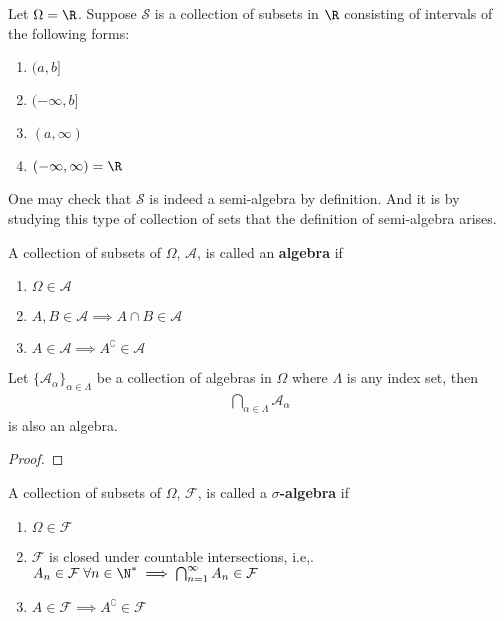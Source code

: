 \documentclass[thmcnt=section, 12pt, color=purple]{my-elegantbook}
\begin{document}
\begin{example} \label{eg:1}
	Let $\Omega = \R$.
	Suppose $\mathcal{S}$ is a collection of subsets in $\R$
	consisting of intervals of the following forms:
	\begin{enumerate}
		\item $(a, b]$
		\item $(-\infty, b]$
		\item $(a, \infty)$
		\item $(-\infty, \infty) = \R$
	\end{enumerate}
	One may check that $\mathcal{S}$ is indeed a semi-algebra by definition.
	And it is by studying this type of collection of sets that
	the definition of semi-algebra arises.
\end{example}


\begin{definition} \label{def:2}
	A collection of subsets of $\Omega$, $\mathcal{A}$,
	is called an \textbf{algebra} if
	\begin{enumerate}
		\item $\Omega \in \mathcal{A}$
		\item $A, B \in \mathcal{A} \implies A \cap B \in \mathcal{A}$
		\item $A \in \mathcal{A} \implies A^\complement \in \mathcal{A}$
	\end{enumerate}
\end{definition}


\begin{proposition} \label{pro:1}
	Let $\{\mathcal{A}_\alpha\}_{\alpha \in \Lambda}$ 
	be a collection of algebras in $\Omega$
	where $\Lambda$ is any index set,
	then 
	\begin{align*}
		\bigcap_{\alpha \in \Lambda} \mathcal{A}_{\alpha}
	\end{align*}
	is also an algebra.
\end{proposition}

\begin{proof}
\end{proof}


\begin{definition} \label{def:3}
	A collection of subsets of $\Omega$, $\mathcal{F}$,
	is called a \textbf{$\sigma$-algebra} if
	\begin{enumerate}
		\item $\Omega \in \mathcal{F}$
		\item $\mathcal{F}$ is closed under countable intersections, 
			i.e,. $A_n \in \mathcal{F} \; \forall n \in \N^\ast \implies \bigcap_{n=1}^\infty A_n \in \mathcal{F}$
		\item $A \in \mathcal{F} \implies A^\complement \in \mathcal{F}$
	\end{enumerate}
\end{definition}
\end{document}
